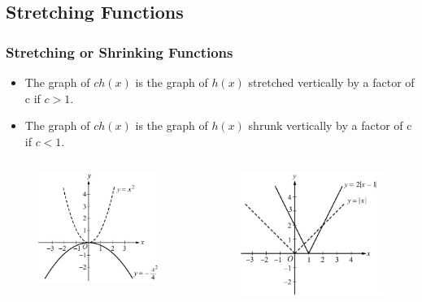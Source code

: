 \documentclass[
	11pt, %
]{beamer}
\begin{document}
\subsection{Stretching Functions}
\begin{frame}
	\frametitle{Stretching or Shrinking Functions}
	\begin{theorem}
		\begin{itemize}
			\item The graph of $ch(x)$ is the graph of $h(x)$ stretched vertically by a factor of c if $c > 1$.
			\item The graph of $ch(x)$ is the graph of $h(x)$ shrunk vertically by a factor of c if $c < 1$.
		\end{itemize}
	\end{theorem}

	\begin{columns}[t] 
		\begin{column}{0.5\textwidth} %
				\begin{figure}
					\includegraphics[width=0.6\linewidth]{Shrinking_Functions1.jpg} 
				\end{figure}
		\end{column}
		\begin{column}{0.5\textwidth} %
			\begin{figure}
					\includegraphics[width=0.6\linewidth]{Shrinking_Shifting_Functions1.jpg} 
			\end{figure}
    \end{column}
	\end{columns}
\end{frame}
\end{document}
